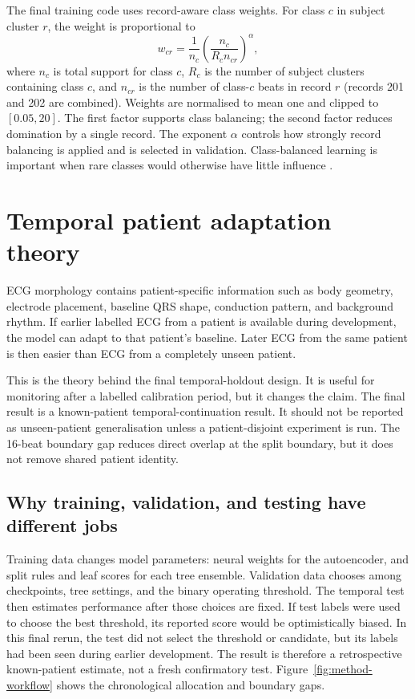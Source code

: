 The final training code uses record-aware class weights. For class $c$ in
subject cluster $r$, the weight is proportional to
\begin{equation}
 w_{cr}=\frac{1}{n_c}
 \left(\frac{n_c}{R_c n_{cr}}\right)^\alpha,
 \label{eq:record-weight}
\end{equation}
where $n_c$ is total support for class $c$, $R_c$ is the number of subject clusters
containing class $c$, and $n_{cr}$ is the number of class-$c$ beats in record
$r$ (records 201 and 202 are combined). Weights are normalised to mean one
and clipped to $[0.05,20]$. The first factor supports class balancing; the second factor reduces
domination by a single record. The exponent $\alpha$ controls how strongly
record balancing is applied and is selected in validation. Class-balanced
learning is important when rare classes would otherwise have little influence
\cite{cui2019classbalanced}.

\section{Temporal patient adaptation theory}

ECG morphology contains patient-specific information such as body geometry,
electrode placement, baseline QRS shape, conduction pattern, and background
rhythm. If earlier labelled ECG from a patient is available during development,
the model can adapt to that patient's baseline. Later ECG from the same patient
is then easier than ECG from a completely unseen patient.

This is the theory behind the final temporal-holdout design. It is useful for
monitoring after a labelled calibration period, but it changes the claim. The
final result is a known-patient temporal-continuation result. It should not be
reported as unseen-patient generalisation unless a patient-disjoint experiment
is run. The 16-beat boundary gap reduces direct overlap at the split boundary,
but it does not remove shared patient identity.

\subsection{Why training, validation, and testing have different jobs}

Training data changes model parameters: neural weights for the autoencoder,
and split rules and leaf scores for each tree ensemble. Validation data
chooses among checkpoints, tree settings, and the binary operating threshold.
The temporal test then estimates performance after those choices are fixed.
If test labels were used to choose the best threshold, its reported score
would be optimistically biased. In this final rerun, the test did not select
the threshold or candidate, but its labels had been seen during earlier
development. The result is therefore a retrospective known-patient estimate,
not a fresh confirmatory test. Figure~\ref{fig:method-workflow} shows the
chronological allocation and boundary gaps.

